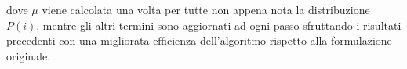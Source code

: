 dove $\mu$ viene calcolata una volta per tutte non appena \e nota la distribuzione $P(i)$,
mentre gli altri termini sono aggiornati ad ogni passo sfruttando i risultati precedenti 
con una migliorata efficienza dell'algoritmo rispetto alla formulazione originale.  

\ealg



\finepar


